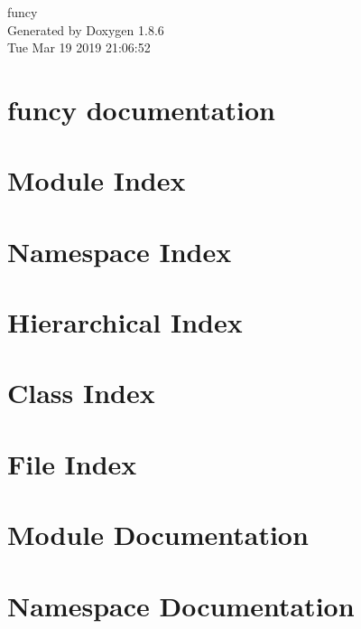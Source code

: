 \documentclass[twoside]{book}
\newcommand{\clearemptydoublepage}{%
  \newpage{\pagestyle{empty}\cleardoublepage}%
}
\begin{document}
\hypersetup{pageanchor=false}
\begin{titlepage}
\vspace*{7cm}
\begin{center}%
{\Large funcy }\\
\vspace*{1cm}
{\large Generated by Doxygen 1.8.6}\\
\vspace*{0.5cm}
{\small Tue Mar 19 2019 21:06:52}\\
\end{center}
\end{titlepage}
\clearemptydoublepage
\tableofcontents
\clearemptydoublepage
{}
\hypersetup{pageanchor=true}

\chapter{funcy documentation}
\label{index}\hypertarget{index}{}
\chapter{Module Index}

\chapter{Namespace Index}

\chapter{Hierarchical Index}

\chapter{Class Index}

\chapter{File Index}

\chapter{Module Documentation}










\chapter{Namespace Documentation}












\end{document}

